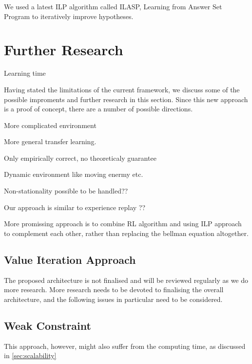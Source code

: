 We used a latest ILP algorithm called ILASP, Learning from Answer Set Program to iteratively improve hypotheses.

\section{Further Research}
\label{sec:further_research}

\begin{description}
    \item[Learning time]
\end{description}    

Having stated the limitations of the current framework, we discuss some of the possible improments and further research in this section.
Since this new approach is a proof of concept, there are a number of possible directions.

More complicated environment

More general transfer learning.

Only empirically correct, no theoreticaly guarantee

Dynamic environment like moving enermy etc.

Non-stationality possible to be handled??

Our approach is similar to experience replay ??

More promissing approach is to combine RL algorithm and using ILP approach to complement each other, rather than replacing the bellman equation altogether. 

\subsection{Value Iteration Approach}

The proposed architecture is not finalised and will be reviewed regularly as we do more research.
More research needs to be devoted to finalising the overall architecture, and the following issues in particular need to be considered.

\subsection{Weak Constraint}

This approach, however, might also suffer from the computing time, as discussed in \ref{sec:scalability}

